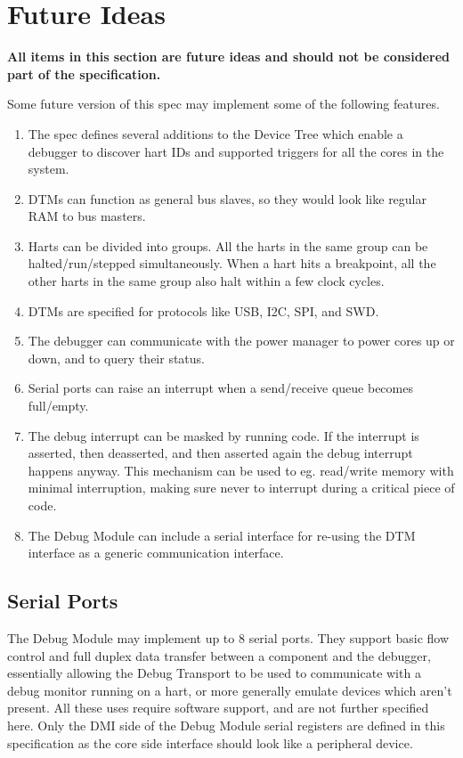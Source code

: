 \chapter{Future Ideas}
\label{sec:future}

\textbf{All items in this section are future ideas and should not be considered part of the specification.}

Some future version of this spec may implement some of the following features.

\begin{enumerate}
   \item The spec defines several additions to the Device Tree which enable a
      debugger to discover hart IDs and supported triggers for all the cores
      in the system.
   \item DTMs can function as general bus slaves, so they would look like
      regular RAM to bus masters.
   \item Harts can be divided into groups. All the harts in the same group can
      be halted/run/stepped simultaneously. When a hart hits a breakpoint, all
      the other harts in the same group also halt within a few clock cycles.
   \item DTMs are specified for protocols like USB, I2C, SPI, and SWD.
   \item The debugger can communicate with the power manager to power cores up
      or down, and to query their status.
   \item Serial ports can raise an interrupt when a send/receive queue becomes full/empty.
   \item The debug interrupt can be masked by running code. If the interrupt is
      asserted, then deasserted, and then asserted again the debug interrupt
      happens anyway. This mechanism can be used to eg. read/write memory with
      minimal interruption, making sure never to interrupt during a critical
      piece of code.
   \item The Debug Module can include a serial interface for re-using
      the DTM interface as a generic communication interface.
\end{enumerate}

\section{Serial Ports}

The Debug Module may implement up to 8 serial ports. They support basic flow
control and full duplex data transfer between a component and the debugger,
essentially allowing the Debug Transport to be used to communicate
with a debug monitor running on a hart, or more generally emulate devices which
aren't present. All these uses require software support, and are not further specified here.
Only the DMI side of the Debug Module serial registers are defined in this
specification as the core side interface should look like a peripheral device.


